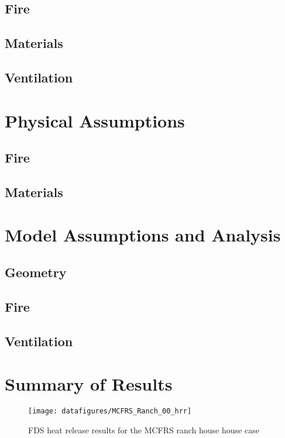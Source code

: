 \documentclass[11pt]{book}
\begin{document}
\subsection{Fire}

\subsection{Materials}

\subsection{Ventilation}

\section{Physical Assumptions}
\subsection{Fire}

\subsection{Materials}

\section{Model Assumptions and Analysis}
\subsection{Geometry}

\subsection{Fire}

\subsection{Ventilation}

\section{Summary of Results}

\begin{figure}[\figoptions]
\begin{center}
 \texttt{[image: datafigures/MCFRS\_Ranch\_00\_hrr]}
\end{center}
\caption {FDS heat release results for the MCFRS ranch house house case}
\label{figranchhrr}%
\end{figure}
\end{document}
